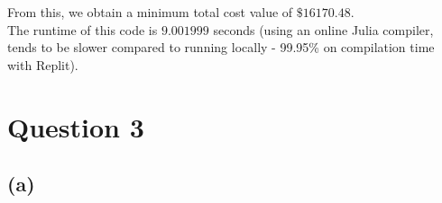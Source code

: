 \documentclass[12pt]{article}
\begin{document}
\noindent From this, we obtain a minimum total cost value of $\boxed{\$ 16170.48}$. \\ 

\noindent The runtime of this code is $\boxed{9.001999}$ seconds (using an online Julia compiler, tends to be slower compared to running locally - 99.95\% on compilation time with Replit).

\newpage

\section*{Question 3}



\subsection*{(a)}   
\end{document}
